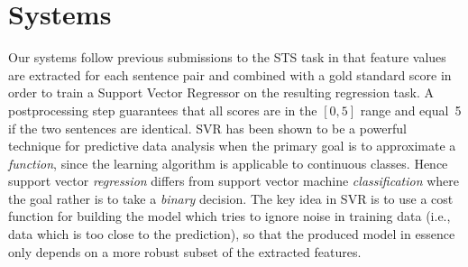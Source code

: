 \section{Systems}
\label{system}

Our systems follow previous submissions to the STS task \citep[e.g.,][]{vsaric2012takelab,Banea2012}
in that feature values are extracted for each sentence pair and combined with a gold standard score 
in order to train a Support Vector Regressor on the resulting regression task. 
A postprocessing step guarantees that all scores are in the $[0,5]$ range and equal~5 if the two sentences are identical. 
%
SVR has been shown to be a powerful technique for predictive data analysis when the primary goal is to approximate 
a {\em function}, since the learning algorithm is applicable to continuous classes.
Hence support vector {\em regression\/} differs from support vector machine {\em classification\/}
where the goal rather is to take a {\em binary\/} decision.
The key idea in SVR is to use a cost function for building the model which tries to ignore noise in
training data (i.e., data which is too close to the prediction), so that the produced model in essence 
only depends on a more robust subset of the extracted features. 



